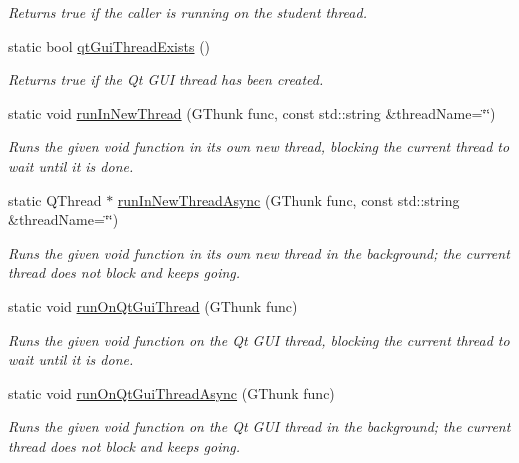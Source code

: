 \begin{DoxyCompactItemize}
\begin{DoxyCompactList}\small\item\em Returns true if the caller is running on the student thread. \end{DoxyCompactList}\item 
static bool \mbox{\hyperlink{classGThread_afee663b5d7998135c2aab0585b2ad37f}{qt\+Gui\+Thread\+Exists}} ()
\begin{DoxyCompactList}\small\item\em Returns true if the Qt G\+UI thread has been created. \end{DoxyCompactList}\item 
static void \mbox{\hyperlink{classGThread_ad70a32318f3f0a9cf25582379c6d7ffb}{run\+In\+New\+Thread}} (G\+Thunk func, const std\+::string \&thread\+Name=\char`\"{}\char`\"{})
\begin{DoxyCompactList}\small\item\em Runs the given void function in its own new thread, blocking the current thread to wait until it is done. \end{DoxyCompactList}\item 
static Q\+Thread $\ast$ \mbox{\hyperlink{classGThread_ad677139bc51c13b4dd55f0c15c7d9624}{run\+In\+New\+Thread\+Async}} (G\+Thunk func, const std\+::string \&thread\+Name=\char`\"{}\char`\"{})
\begin{DoxyCompactList}\small\item\em Runs the given void function in its own new thread in the background; the current thread does not block and keeps going. \end{DoxyCompactList}\item 
static void \mbox{\hyperlink{classGThread_a33da0c87717269710ac7a564a1ebbe64}{run\+On\+Qt\+Gui\+Thread}} (G\+Thunk func)
\begin{DoxyCompactList}\small\item\em Runs the given void function on the Qt G\+UI thread, blocking the current thread to wait until it is done. \end{DoxyCompactList}\item 
static void \mbox{\hyperlink{classGThread_a4445680030c65d610b9e348d8d0cffc8}{run\+On\+Qt\+Gui\+Thread\+Async}} (G\+Thunk func)
\begin{DoxyCompactList}\small\item\em Runs the given void function on the Qt G\+UI thread in the background; the current thread does not block and keeps going. \end{DoxyCompactList}\item 

\end{DoxyCompactItemize}

